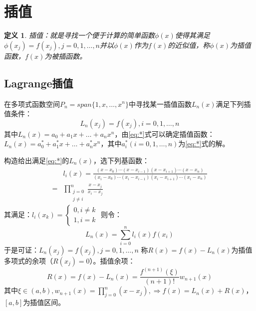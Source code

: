 \documentclass[a4paper]{article}
\newtheorem{definition}{定义}[section]
\begin{document}
\section{插值}
\begin{definition}
    插值：就是寻找一个便于计算的简单函数$\phi(x)$使得其满足$\phi(x_j)=f(x_j), j=0,1,\dots, n$并以$\phi(x)$作为$f(x)$的近似值，称$\phi(x)$为插值函数，$f(x)$为被插函数。
\end{definition}

\subsection{Lagrange插值}
在多项式函数空间$P_n=span\{1,x,\dots, x^n\}$中寻找某一插值函数$L_n(x) $满足下列插值条件：
\begin{equation}
    L_n(x_j)=f(x_j), i=0,1,\dots, n 
    \label{eq:*}
\end{equation}
其中$L_n(x) = a_0 + a_1x + \dots+ a_nx^n$，由\ref{eq:*}式可以确定插值函数：$L_n(x)=a_0^* + a_1^*x + \dots+ a_n^*x^n $，其中$a_i^*(i=0,1,\dots, n)$为\ref{eq:*}式的解。

构造给出满足\ref{eq:*}的$L_n(x) $，选下列基函数：
\begin{equation}
    \begin{split}
        &l_i(x) = \frac{(x-x_0)\cdots(x-x_{i-1})(x-x_{i+1})\cdots(x-x_n)}{(x_i-x_0)\cdots(x_i-x_{i-1})(x_i-x_{i+1})\cdots(x_i-x_n)}\\
    =&\prod^n_{\substack{j=0\\j\neq i}}\frac{x-x_j}{x_i-x_j}
    \end{split}
\end{equation}
其满足：$l_i(x_k) = \left\{\begin{array}{lr}
    0, i\neq k \\ 1, i= k
\end{array}\right.$
则令：
\begin{equation}
    L_n(x) = \sum^n_{i=0}l_i(x)f(x_i)
\end{equation}
于是可证：$L_n(x_j)=f(x_j), j=0,1,\dots, n $
称$R(x)=f(x)-L_n(x) $为插值多项式的余项（$R(x_j)=0$）。插值余项：
$$R(x) = f(x)-L_n(x)=\frac{f^{(n+1)}(\xi)}{(n+1)!}w_{n+1}(x) $$
其中$\xi \in (a,b), w_{n+1}(x)=\prod^n_{j=0}(x-x_j) , \Rightarrow f(x)=L_n(x)+R(x) $，$[a,b]$为插值区间。
\end{document}
